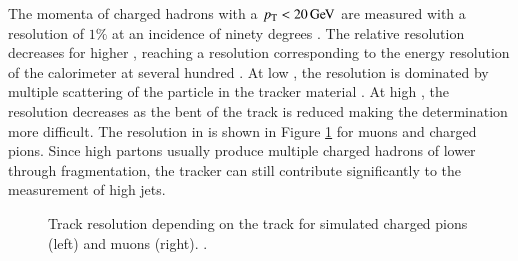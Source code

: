 The momenta of charged hadrons with a $p_{\mathrm{T}} < 20 \,\text{Ge\hspace{-.08em}V}$ are measured with a resolution of $1\%$ at an incidence of ninety degrees \cite{Sirunyan:2017ulk}. The relative resolution decreases for higher \pt, reaching a resolution corresponding to 
the energy resolution of the calorimeter at several hundred \GeV. 
At low \pt, the resolution is dominated by multiple scattering of the particle in the tracker material \cite{1748-0221-9-10-P10009}. At high \pt, the resolution decreases as the bent of the track is
reduced making the \pt determination more difficult. The resolution in \pt is shown in Figure \ref{fig:det_trackeffs} for muons and charged pions.
Since high \pt partons usually produce multiple charged hadrons of lower \pt through fragmentation, the tracker can still contribute significantly 
to the measurement of high \pt jets.

\begin{figure}[htbp!]
  \begin{center}

\caption{Track \pt resolution depending on the track \pt for simulated charged pions (left) and muons (right). \cite{1748-0221-9-10-P10009}.
  \label{fig:det_trackeffs}}
  \end{center}
\end{figure}


